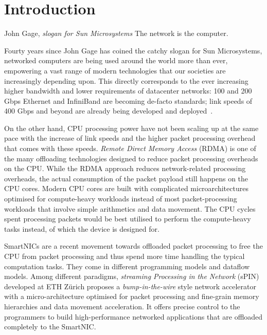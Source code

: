 \chapter{Introduction}
\begin{chapquote}{John Gage, \textit{slogan for Sun Microsystems}}
The network is the computer.
\end{chapquote}

Fourty years since John Gage has coined the catchy slogan for Sun Microsystems, networked computers are being used around the world more than ever, empowering a vast range of modern technologies that our societies are increasingly depending upon.  This directly corresponds to the ever increasing higher bandwidth and lower requirements  of datacenter networks: 100 and 200 Gbps Ethernet and InfiniBand are becoming de-facto standards; link speeds of 400 Gbps and beyond are already being developed and deployed~\cite{miller_pursuit_nodate}.

On the other hand, CPU processing power have not been scaling up at the same pace with the increase of link speeds and the higher packet processing overhead that comes with these speeds.  \emph{Remote Direct Memory Access} (RDMA) is one of the many offloading technologies designed to reduce packet processing overheads on the CPU.  While the RDMA approach reduces network-related processing overheads, the actual consumption of the packet payload still happens on the CPU cores.  Modern CPU cores are built with complicated microarchitectures optimised for compute-heavy workloads instead of most packet-processing workloads that involve simple arithmetics and data movement.  The CPU cycles spent processing packets would be best utilised to perform the compute-heavy tasks instead,  of which the device is designed for. 

SmartNICs are a recent movement towards offloaded packet processing to free the CPU from packet processing and thus spend more time handling the typical computation tasks.  They come in different programming models and dataflow models.  Among different paradigms, \emph{streaming Processing in the Network} (sPIN)~\cite{hoefler_spin_2017} developed at ETH Z\"urich proposes a \emph{bump-in-the-wire}  style network accelerator with a micro-architecture optimised for packet processing and fine-grain memory hierarchies and data movement acceleration.  It offers precise control to the programmers to build high-performance networked applications that are offloaded completely to the SmartNIC.

